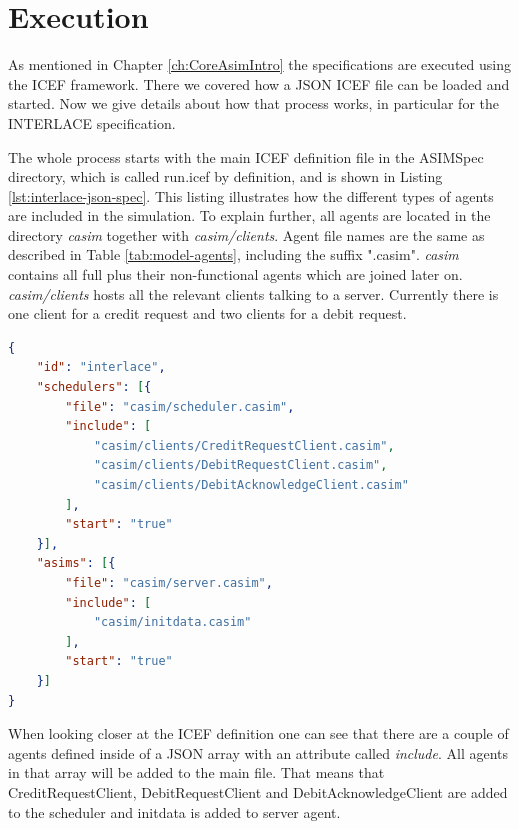 \section{Execution}

As mentioned in Chapter \ref{ch:CoreAsimIntro} the specifications are executed using the ICEF framework. There we covered how a JSON ICEF file can be loaded and started. Now we give details about how that process works, in particular for the INTERLACE specification.

The whole process starts with the main ICEF definition file in the ASIMSpec directory, which is called run.icef by definition, and is shown in Listing \ref{lst:interlace-json-spec}. This listing illustrates how the different types of agents are included in the simulation. To explain further, all agents are located in the directory \textit{casim} together with \textit{casim/clients}. Agent file names are the same as described in Table \ref{tab:model-agents}, including the suffix ".casim". \textit{casim} contains all full plus their non-functional agents which are joined later on. \textit{casim/clients} hosts all the relevant clients talking to a server. Currently there is one client for a credit request and two clients for a debit request.

\begin{center}
\begin{minipage}{0.8\textwidth}
\small
\begin{lstlisting}[language=json,firstnumber=1,caption={\bf\small ICEF JSON Specification for INTERLACE},captionpos=b,label=lst:interlace-json-spec]
{
    "id": "interlace", 
    "schedulers": [{
        "file": "casim/scheduler.casim",
        "include": [
            "casim/clients/CreditRequestClient.casim",
            "casim/clients/DebitRequestClient.casim",
            "casim/clients/DebitAcknowledgeClient.casim"
        ],
        "start": "true"
    }],
    "asims": [{
        "file": "casim/server.casim",
        "include": [
            "casim/initdata.casim"
        ],
        "start": "true"
    }]
}
\end{lstlisting}
\end{minipage}
\end{center}

When looking closer at the ICEF definition one can see that there are a couple of agents defined inside of a JSON array with an attribute called \textit{include}. All agents in that array will be added to the main file. That means that CreditRequestClient, DebitRequestClient and DebitAcknowledgeClient are added to the scheduler and initdata is added to server agent.

